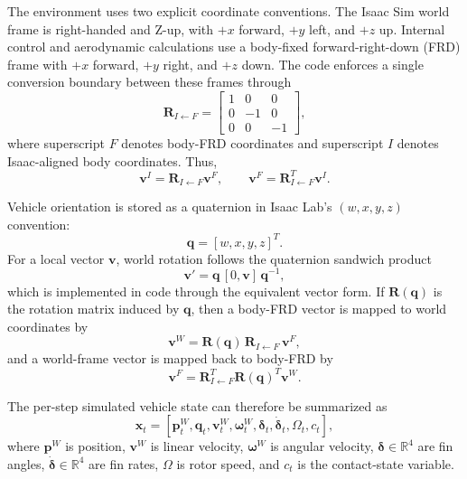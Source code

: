 \documentclass[10pt,twocolumn]{article}
\begin{document}
The environment uses two explicit coordinate conventions. The Isaac Sim world frame is right-handed and Z-up, with $+x$ forward, $+y$ left, and $+z$ up. Internal control and aerodynamic calculations use a body-fixed forward-right-down (FRD) frame with $+x$ forward, $+y$ right, and $+z$ down. The code enforces a single conversion boundary between these frames through
\begin{equation}
\mathbf{R}_{I\leftarrow F} =
\begin{bmatrix}
1 & 0 & 0 \\
0 & -1 & 0 \\
0 & 0 & -1
\end{bmatrix},
\label{eq:frd_isaac_map}
\end{equation}
where superscript $F$ denotes body-FRD coordinates and superscript $I$ denotes Isaac-aligned body coordinates. Thus,
\begin{equation}
\mathbf{v}^{I} = \mathbf{R}_{I\leftarrow F}\mathbf{v}^{F},
\qquad
\mathbf{v}^{F} = \mathbf{R}_{I\leftarrow F}^{T}\mathbf{v}^{I}.
\label{eq:frd_bidirectional}
\end{equation}

Vehicle orientation is stored as a quaternion in Isaac Lab's $(w,x,y,z)$ convention:
\begin{equation}
\mathbf{q} = [w,x,y,z]^{T}.
\end{equation}
For a local vector $\mathbf{v}$, world rotation follows the quaternion sandwich product
\begin{equation}
\mathbf{v}' = \mathbf{q}\,[0,\mathbf{v}]\,\mathbf{q}^{-1},
\label{eq:quat_rotation}
\end{equation}
which is implemented in code through the equivalent vector form. If $\mathbf{R}(\mathbf{q})$ is the rotation matrix induced by $\mathbf{q}$, then a body-FRD vector is mapped to world coordinates by
\begin{equation}
\mathbf{v}^{W} = \mathbf{R}(\mathbf{q})\,\mathbf{R}_{I\leftarrow F}\,\mathbf{v}^{F},
\label{eq:body_to_world}
\end{equation}
and a world-frame vector is mapped back to body-FRD by
\begin{equation}
\mathbf{v}^{F} = \mathbf{R}_{I\leftarrow F}^{T}\mathbf{R}(\mathbf{q})^{T}\mathbf{v}^{W}.
\label{eq:world_to_body}
\end{equation}

The per-step simulated vehicle state can therefore be summarized as
\begin{equation}
\mathbf{x}_{t} =
\left[
\mathbf{p}_{t}^{W},
\mathbf{q}_{t},
\mathbf{v}_{t}^{W},
\boldsymbol{\omega}_{t}^{W},
\boldsymbol{\delta}_{t},
\dot{\boldsymbol{\delta}}_{t},
\Omega_{t},
c_{t}
\right],
\label{eq:state_vector}
\end{equation}
where $\mathbf{p}^{W}$ is position, $\mathbf{v}^{W}$ is linear velocity, $\boldsymbol{\omega}^{W}$ is angular velocity, $\boldsymbol{\delta}\in\mathbb{R}^{4}$ are fin angles, $\dot{\boldsymbol{\delta}}\in\mathbb{R}^{4}$ are fin rates, $\Omega$ is rotor speed, and $c_t$ is the contact-state variable.
\end{document}
